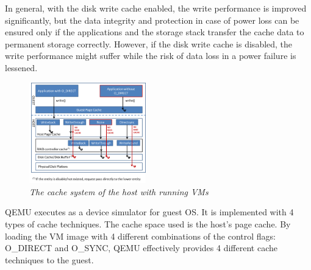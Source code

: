 \documentclass{acmsig}
\begin{document}
  In general, with the disk write cache enabled, the write performance is improved significantly, but the data integrity and protection in case of power loss can be ensured only if the applications and the storage stack transfer the cache data to permanent storage correctly. However, if the disk write cache is disabled, the write performance might suffer while the risk of data loss in a power failure is lessened.

  \begin{figure}[htbp]
    \centering
    \includegraphics[width=0.45\textwidth]{figures/cachesystem.png}
    \caption{\textit{The cache system of the host with running VMs }}
    \label{cache_system}
\end{figure}

  QEMU executes as a device simulator for guest OS. It is implemented with 4 types of cache techniques. The cache space used is the host's page cache. By loading the VM image with 4 different combinations of the control flags: O\_DIRECT and O\_SYNC, QEMU effectively provides 4 different cache techniques to the guest.
  
\end{document}
